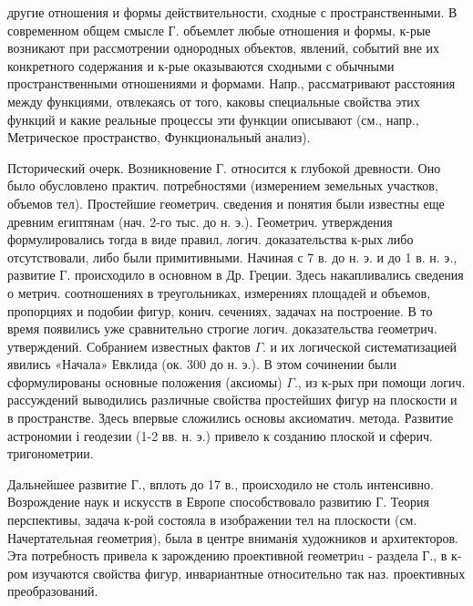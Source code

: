 \documentclass[10pt]{article}
\begin{document}
другие отношения и формы действительности, сходные с пространственными. В современном общем смысле Г. объемлет любые отношения и формы, к-рые возникают при рассмотрении однородных объектов, явлений, событий вне их конкретного содержания и к-рые оказываются сходными с обычными пространственными отношениями и формами. Напр., рассматривают расстояния между функциями, отвлекаясь от того, каковы специальные свойства этих функций и какие реальные процессы эти функции описывают (см., напр., Метрическое пространство, Функциональный анализ).



Псторический очерк. Возникновение Г. относится к глубокой древности. Оно было обусловлено практич. потребностями (измерением земельных участков, объемов тел). Простейшие геометрич. сведения и понятия были известны еще древним египтянам (нач. 2-го тыс. до н. э.). Геометрич. утверждения формулировались тогда в виде правил, логич. доказательства к-рых либо отсутствовали, либо были примитивными. Начиная с 7 в. до н. э. и до 1 в. н. э., развитие Г. происходило в основном в Др. Греции. Здесь накапливались сведения о метрич. соотношениях в треугольниках, измерениях площадей и объемов, пропорциях и подобии фигур, конич. сечениях, задачах на построение. В то время появились уже сравнительно строгие логич. доказательства геометрич. утверждений. Собранием известных фактов $\Gamma$. и их логической систематизацией явились «Начала» Евклида (ок. 300 до н. э.). В этом сочинении были сформулированы основные положения (аксиомы) $\Gamma .$, из к-рых при помощи логич. рассуждений выводились различные свойства простейших фигур на плоскости и в пространстве. Здесь впервые сложились основы аксиоматич. метода. Развитие астрономии і геодезии (1-2 вв. н. э.) привело к созданию плоской и сферич. тригонометрии.



Дальнейшее развитие Г., вплоть до 17 в., происходило не столь интенсивно. Возрождение наук и искусств в Европе способствовало развитию Г. Теория перспективы, задача к-рой состояла в изображении тел на плоскости (см. Начертательная геометрия), была в центре вниманія художников и архитекторов. Эта потребность привела к зарождению проективной геометриu - раздела Г., в к-ром изучаются свойства фигур, инвариантные относительно так наз. проективных преобразований.
\end{document}

